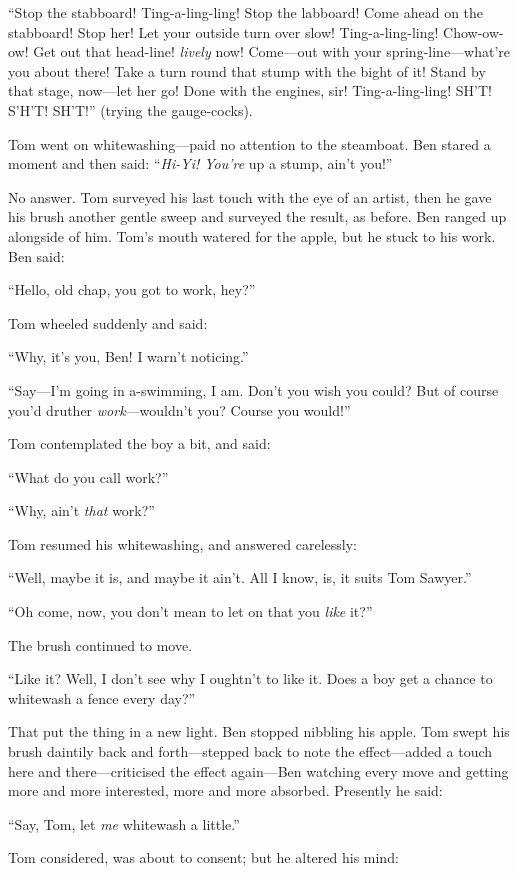 \documentclass{book}
\begin{document}
“Stop the stabboard! Ting-a-ling-ling! Stop the labboard! Come ahead on the stabboard! Stop her! Let your outside turn over slow! Ting-a-ling-ling! Chow-ow-ow! Get out that head-line! \emph{lively} now! Come—out with your spring-line—what’re you about there! Take a turn round that stump with the bight of it! Stand by that stage, now—let her go! Done with the engines, sir! Ting-a-ling-ling! SH’T! S’H’T! SH’T!” (trying the gauge-cocks).

Tom went on whitewashing—paid no attention to the steamboat. Ben stared a moment and then said: “\emph{Hi-Yi! You’re} up a stump, ain’t you!”

No answer. Tom surveyed his last touch with the eye of an artist, then he gave his brush another gentle sweep and surveyed the result, as before. Ben ranged up alongside of him. Tom’s mouth watered for the apple, but he stuck to his work. Ben said:

“Hello, old chap, you got to work, hey?”

Tom wheeled suddenly and said:

“Why, it’s you, Ben! I warn’t noticing.”

“Say—I’m going in a-swimming, I am. Don’t you wish you could? But of course you’d druther \emph{work}—wouldn’t you? Course you would!”

Tom contemplated the boy a bit, and said:

“What do you call work?”

“Why, ain’t \emph{that} work?”

Tom resumed his whitewashing, and answered carelessly:

“Well, maybe it is, and maybe it ain’t. All I know, is, it suits Tom Sawyer.”

“Oh come, now, you don’t mean to let on that you \emph{like} it?”

The brush continued to move.

“Like it? Well, I don’t see why I oughtn’t to like it. Does a boy get a chance to whitewash a fence every day?”

That put the thing in a new light. Ben stopped nibbling his apple. Tom swept his brush daintily back and forth—stepped back to note the effect—added a touch here and there—criticised the effect again—Ben watching every move and getting more and more interested, more and more absorbed. Presently he said:

“Say, Tom, let \emph{me} whitewash a little.”

Tom considered, was about to consent; but he altered his mind:
\end{document}
